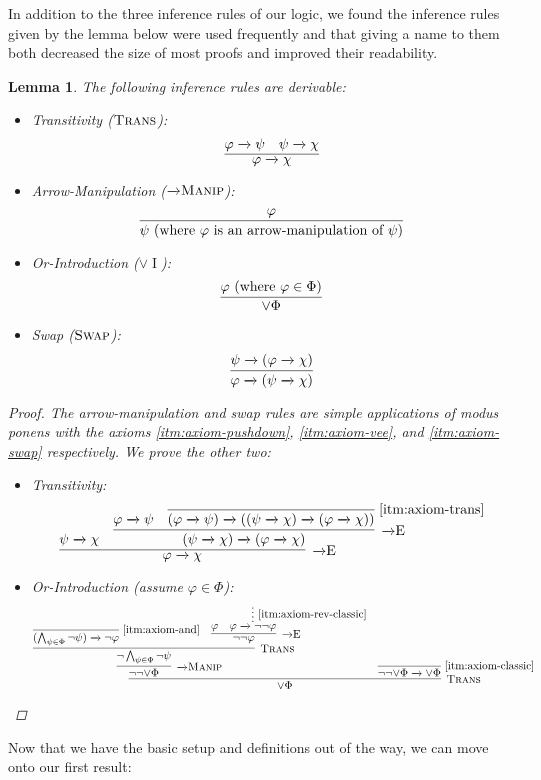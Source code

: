 \documentclass{amsart}
\newtheorem{lemma}[theorem]{Lemma}
\theoremstyle{definition}
\numberwithin{equation}{theorem}
\renewcommand{\phi}{\varphi}
\newcommand{\unvee}{{\vee}}
\newcommand{\narrow}[1]{\xrightarrow{#1}}
\renewcommand{\to}{\narrow{}}
\newcommand{\arr}{{\to}}
\newcommand{\intro}{\!\operatorname{I}}
\newcommand{\elim}{\!\operatorname{E}}
\newcommand{\trans}{\text{\sc{Trans}}}
\newcommand{\aref}[1]{\!\text{\ref{itm:axiom-#1}}}
\newcommand{\swap}{\text{\sc{Swap}}}
\newcommand{\pushdown}{\arr\text{\sc{Manip}}}
\begin{document}
In addition to the three inference rules of our logic, we found the inference rules given by the lemma below were used frequently and that giving a name to them both decreased the size of most proofs and improved their readability.
\begin{lemma}\label{lem:inference-rules}
  The following inference rules are derivable:
  {\normalfont
  \begin{itemize}
  \item Transitivity ($\trans$):
    \[
      \infer{\phi\to\chi}{\phi\to\psi & \psi\to\chi}
    \]
  \item
    Arrow-Manipulation ($\pushdown$):
    \[
      \infer{\psi\text{ (where $\phi$ is an arrow-manipulation of $\psi$)}}{\phi}
    \]
  \item
    Or-Introduction ($\unvee\intro$):
    \[
      \infer{\unvee\Phi}{\phi\text{ (where $\phi\in\Phi$)}}
    \]
  \item Swap ($\swap$):
    \[
      \infer{\phi\to(\psi\to\chi)}{\psi\to(\phi\to\chi)}
    \]
  \end{itemize}
  }
  \begin{proof}
  The arrow-manipulation and swap rules are simple applications of modus ponens with the axioms \ref{itm:axiom-pushdown}, \ref{itm:axiom-vee}, and \ref{itm:axiom-swap} respectively.
  We prove the other two:
    \begin{itemize}
    \item Transitivity:
      \[
	      \infer[\arr\elim]{\phi\to\chi}{
	        \psi\to\chi &
	        \infer[\arr\elim]{(\psi\to\chi)\to(\phi\to\chi)}{
	          \phi\to\psi &
	          \infer[\aref{trans}]{(\phi\to\psi)\to((\psi\to\chi)\to(\phi\to\chi))}{}
	        }
	      }
      \]
	  \item Or-Introduction (assume $\phi\in\Phi$):
	    \[
	      \infer[\trans]{\unvee\Phi}{
	        \infer[\pushdown]{\neg\neg\unvee\Phi}{
	          \infer[\trans]{\neg\bigwedge_{\psi\in\Phi}\neg\psi}{
	            \infer[\aref{and}]{(\bigwedge_{\psi\in\Phi}\neg\psi)\to\neg\phi}{} &
	            \infer[\arr\elim]{\neg\neg\phi}{
	              \phi &
	              \infer*[\aref{rev-classic}]{\phi\to\neg\neg\phi}{}
	            }
	          }
	        } &
	        \infer[\aref{classic}]{\neg\neg\unvee\Phi\to\unvee\Phi}{}
	      }
	      \qedhere
	    \]
    \end{itemize}
  \end{proof}
\end{lemma}
Now that we have the basic setup and definitions out of the way, we can move onto our first result:
\end{document}

